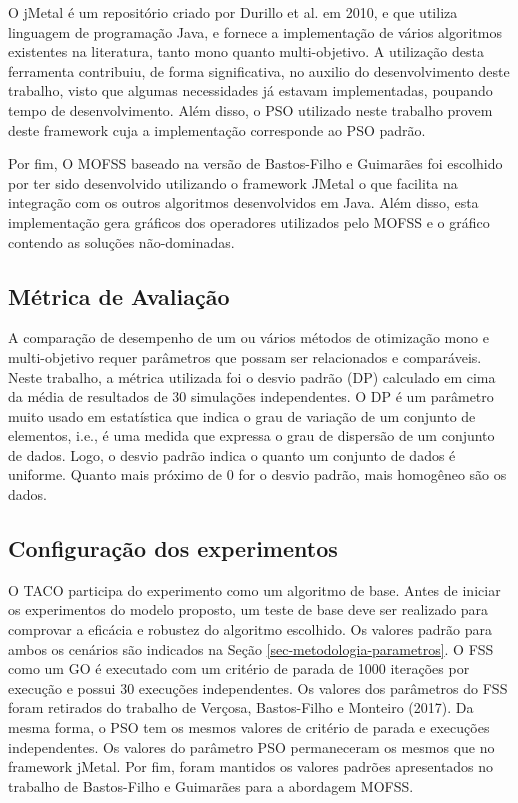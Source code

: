 O jMetal é um repositório criado por Durillo et al. em 2010, e que utiliza linguagem de programação Java, e fornece a implementação de vários algoritmos existentes na literatura, tanto mono quanto multi-objetivo. A utilização desta ferramenta contribuiu, de forma significativa, no auxilio do desenvolvimento deste trabalho, visto que algumas necessidades já estavam implementadas, poupando tempo de desenvolvimento. Além disso, o PSO utilizado neste trabalho provem deste framework cuja a implementação corresponde ao PSO padrão.

Por fim, O MOFSS baseado na versão de Bastos-Filho e Guimarães foi escolhido por ter sido desenvolvido utilizando o framework JMetal o que facilita na integração com os outros algoritmos desenvolvidos em Java. Além disso, esta implementação gera gráficos dos operadores utilizados pelo MOFSS e o gráfico contendo as soluções não-dominadas.

\subsection{Métrica de Avaliação}
\label{sec-metodologia-experimento}

A comparação de desempenho de um ou vários métodos de otimização mono e multi-objetivo requer parâmetros que possam ser relacionados e comparáveis. Neste trabalho, a métrica utilizada foi o desvio padrão (DP) calculado em cima da média de resultados de 30 simulações independentes. O DP é um parâmetro muito usado em estatística que indica o grau de variação de um conjunto de elementos, i.e., é uma medida que expressa o grau de dispersão de um conjunto de dados. Logo, o desvio padrão indica o quanto um conjunto de dados é uniforme. Quanto mais próximo de 0 for o desvio padrão, mais homogêneo são os dados.

\subsection{Configuração dos experimentos}
\label{sec-metodologia-config}

O TACO participa do experimento como um algoritmo de base. Antes de iniciar os experimentos do modelo proposto, um teste de base deve ser realizado para comprovar a eficácia e robustez do algoritmo escolhido. Os valores padrão para ambos os cenários são indicados na Seção \ref{sec-metodologia-parametros}. O FSS como um GO é executado com um critério de parada de 1000 iterações por execução e possui 30 execuções independentes. Os valores dos parâmetros do FSS foram retirados do trabalho de Verçosa, Bastos-Filho e Monteiro (2017). Da mesma forma, o PSO tem os mesmos valores de critério de parada e execuções independentes. Os valores do parâmetro PSO permaneceram os mesmos que no framework jMetal. Por fim, foram mantidos os valores padrões apresentados no trabalho de Bastos-Filho e Guimarães para a abordagem MOFSS.